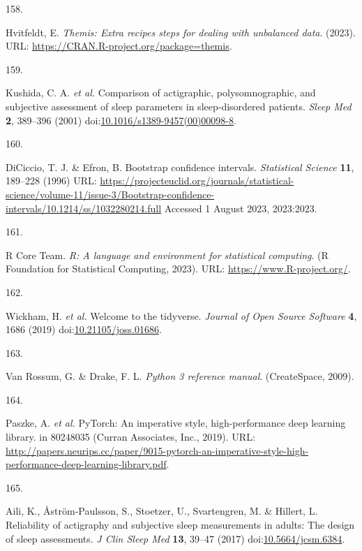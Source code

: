 \documentclass[
  10pt,
]{scrbook}
\newlength{\cslhangindent}
\newlength{\csllabelwidth}
\newlength{\cslentryspacingunit} %
\newenvironment{CSLReferences}[2] %
 {%
  \setlength{\parindent}{0pt}
  \ifodd #1
  \let\oldpar\par
  \def\par{\hangindent=\cslhangindent\oldpar}
  \fi
  \setlength{\parskip}{#2\cslentryspacingunit}
 }%
 {}
\newcommand{\CSLLeftMargin}[1]{\parbox[t]{\csllabelwidth}{#1}}
\newcommand{\CSLRightInline}[1]{\parbox[t]{\linewidth - \csllabelwidth}{#1}\break}
\let\originaltextbf\textbf
\renewcommand{\textbf}[1]{\textcolor{color1}{\originaltextbf{#1}}}
\begin{document}
\begin{CSLReferences}{0}{0}
\leavevmode{}%
\CSLLeftMargin{158. }%
\CSLRightInline{Hvitfeldt, E. \emph{Themis: Extra recipes steps for
dealing with unbalanced data}. (2023). URL:
\url{https://CRAN.R-project.org/package=themis}.}

\leavevmode{}%
\CSLLeftMargin{159. }%
\CSLRightInline{Kushida, C. A. \emph{et al.} Comparison of actigraphic,
polysomnographic, and subjective assessment of sleep parameters in
sleep-disordered patients. \emph{Sleep Med} \textbf{2}, 389--396 (2001)
doi:\href{https://doi.org/10.1016/s1389-9457(00)00098-8}{10.1016/s1389-9457(00)00098-8}.}

\leavevmode{}%
\CSLLeftMargin{160. }%
\CSLRightInline{DiCiccio, T. J. \& Efron, B. Bootstrap confidence
intervals. \emph{Statistical Science} \textbf{11}, 189--228 (1996) URL:
\url{https://projecteuclid.org/journals/statistical-science/volume-11/issue-3/Bootstrap-confidence-intervals/10.1214/ss/1032280214.full}
Accessed 1 August 2023, 2023:2023.}

\leavevmode{}%
\CSLLeftMargin{161. }%
\CSLRightInline{R Core Team. \emph{R: A language and environment for
statistical computing}. (R Foundation for Statistical Computing, 2023).
URL: \url{https://www.R-project.org/}.}

\leavevmode{}%
\CSLLeftMargin{162. }%
\CSLRightInline{Wickham, H. \emph{et al.} Welcome to the tidyverse.
\emph{Journal of Open Source Software} \textbf{4}, 1686 (2019)
doi:\href{https://doi.org/10.21105/joss.01686}{10.21105/joss.01686}.}

\leavevmode{}%
\CSLLeftMargin{163. }%
\CSLRightInline{Van Rossum, G. \& Drake, F. L. \emph{Python 3 reference
manual}. (CreateSpace, 2009).}

\leavevmode{}%
\CSLLeftMargin{164. }%
\CSLRightInline{Paszke, A. \emph{et al.} PyTorch: An imperative style,
high-performance deep learning library. in 80248035 (Curran Associates,
Inc., 2019). URL:
\url{http://papers.neurips.cc/paper/9015-pytorch-an-imperative-style-high-performance-deep-learning-library.pdf}.}

\leavevmode{}%
\CSLLeftMargin{165. }%
\CSLRightInline{Aili, K., Åström-Paulsson, S., Stoetzer, U.,
Svartengren, M. \& Hillert, L. Reliability of actigraphy and subjective
sleep measurements in adults: The design of sleep assessments. \emph{J
Clin Sleep Med} \textbf{13}, 39--47 (2017)
doi:\href{https://doi.org/10.5664/jcsm.6384}{10.5664/jcsm.6384}.}


\end{CSLReferences}
\end{document}

